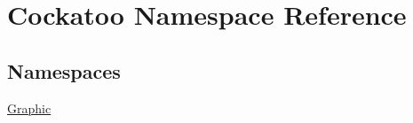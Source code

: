 \hypertarget{namespaceCockatoo}{}\section{Cockatoo Namespace Reference}
\label{namespaceCockatoo}
\subsection*{Namespaces}
\begin{DoxyCompactItemize}
\item 
 \hyperlink{namespaceCockatoo_1_1Graphic}{Graphic}
\end{DoxyCompactItemize}
